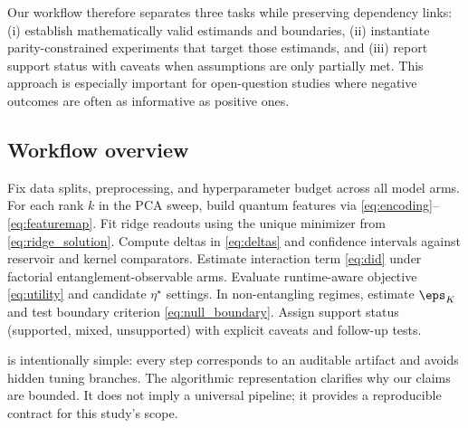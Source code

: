 Our workflow therefore separates three tasks while preserving dependency links: (i) establish mathematically valid estimands and boundaries, (ii) instantiate parity-constrained experiments that target those estimands, and (iii) report support status with caveats when assumptions are only partially met. This approach is especially important for open-question studies where negative outcomes are often as informative as positive ones.

\subsection{Workflow overview}
\begin{algorithm}[t]
\caption{Parity-Constrained QRC Evaluation Workflow}
\label{alg:workflow}
\begin{algorithmic}[1]
\STATE Fix data splits, preprocessing, and hyperparameter budget across all model arms.
\STATE For each rank $k$ in the PCA sweep, build quantum features via \eqref{eq:encoding}--\eqref{eq:featuremap}.
\STATE Fit ridge readouts using the unique minimizer from \eqref{eq:ridge_solution}.
\STATE Compute deltas in \eqref{eq:deltas} and confidence intervals against reservoir and kernel comparators.
\STATE Estimate interaction term \eqref{eq:did} under factorial entanglement-observable arms.
\STATE Evaluate runtime-aware objective \eqref{eq:utility} and candidate $\eta^\star$ settings.
\STATE In non-entangling regimes, estimate $\eps_K$ and test boundary criterion \eqref{eq:null_boundary}.
\STATE Assign support status (supported, mixed, unsupported) with explicit caveats and follow-up tests.
\end{algorithmic}
\end{algorithm}

 is intentionally simple: every step corresponds to an auditable artifact and avoids hidden tuning branches. The algorithmic representation clarifies why our claims are bounded. It does not imply a universal pipeline; it provides a reproducible contract for this study's scope.

